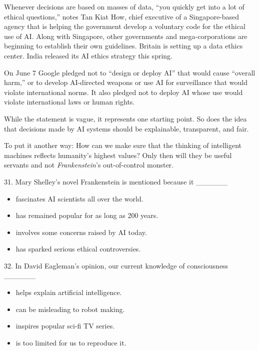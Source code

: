 \documentclass[UTF8,11pt]{ctexart}
\begin{document}
Whenever decisions are based on masses of data, “you quickly get into a lot of ethical questions,” notes Tan Kiat How, chief executive of a Singapore-based agency that is helping the government develop a voluntary code for the ethical use of AI. Along with Singapore, other governments and mega-corporations are beginning to establish their own guidelines. Britain is setting up a data ethics center. India released its AI ethics strategy this spring.


On June 7 Google pledged not to “design or deploy AI” that would cause “overall harm,” or to develop AI-directed weapons or use AI for surveillance that would violate international norms. It also pledged not to deploy AI whose use would violate international laws or human rights.


While the statement is vague, it represents one starting point. So does the idea that decisions made by AI systems should be explainable, transparent, and fair.


To put it another way: How can we make sure that the thinking of intelligent machines reflects humanity’s highest values? Only then will they be useful servants and not \textit{Frankenstein}’s out-of-control monster.


31. Mary Shelley’s novel Frankenstein is mentioned because it \_\_\_\_\_\_


\begin{itemize}[leftmargin=2em,itemsep=.2em,topsep=.4em]\item[A.] fascinates AI scientists all over the world.
\item[B.] has remained popular for as long as 200 years.
\item[C.] involves some concerns raised by AI today.
\item[D.] has sparked serious ethical controversies.
\end{itemize}

32. In David Eagleman’s opinion, our current knowledge of consciousness \_\_\_\_\_\_


\begin{itemize}[leftmargin=2em,itemsep=.2em,topsep=.4em]\item[A.] helps explain artificial intelligence.
\item[B.] can be misleading to robot making.
\item[C.] inspires popular sci-fi TV series.
\item[D.] is too limited for us to reproduce it.
\end{itemize}
\end{document}
